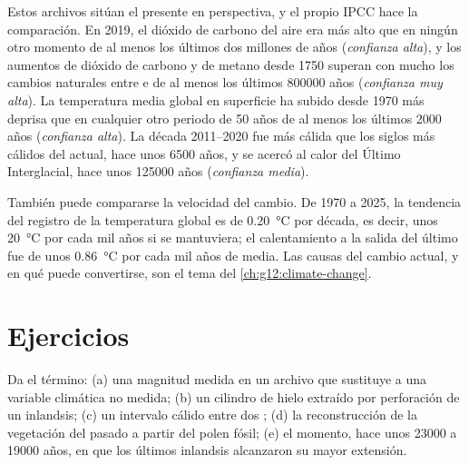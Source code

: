 Estos archivos sitúan el presente en perspectiva, y el propio IPCC hace la
comparación. En 2019, el dióxido de carbono del aire era más alto que en ningún otro momento de
al menos los últimos dos millones de años (\emph{confianza alta}), y los aumentos de dióxido
de carbono y de metano desde 1750 superan con mucho los cambios naturales entre 
e  de al menos los últimos \num{800000} años (\emph{confianza
muy alta}). La temperatura media global en superficie ha subido desde 1970 más deprisa que
en cualquier otro periodo de 50 años de al menos los últimos \num{2000} años
(\emph{confianza alta}). La década 2011--2020 fue más cálida que los siglos más cálidos
del  actual, hace unos \num{6500} años, y se acercó
al calor del Último Interglacial, hace unos \num{125000} años
(\emph{confianza media}).

También puede compararse la velocidad del cambio. De 1970 a 2025, la tendencia del
registro de la temperatura global es de \qty{0.20}{\degreeCelsius} por década, es decir,
unos \qty{20}{\degreeCelsius} por cada mil años si se mantuviera; el
calentamiento a la salida del último  fue de unos
\qty{0.86}{\degreeCelsius} por cada mil años de media. Las causas del cambio actual,
y en qué puede convertirse, son el tema del \cref{ch:g12:climate-change}.

\section{Ejercicios}

\begin{exercise}[$\star$]\label{exo:g12:past-climates:1}
Da el término: (a) una magnitud medida en un archivo que sustituye a una
variable climática no medida; (b) un cilindro de hielo extraído por perforación de un inlandsis;
(c) un intervalo cálido entre dos ; (d) la reconstrucción de la
vegetación del pasado a partir del polen fósil; (e) el momento, hace unos \num{23000} a \num{19000}
años, en que los últimos inlandsis alcanzaron su mayor extensión.
\end{exercise}

